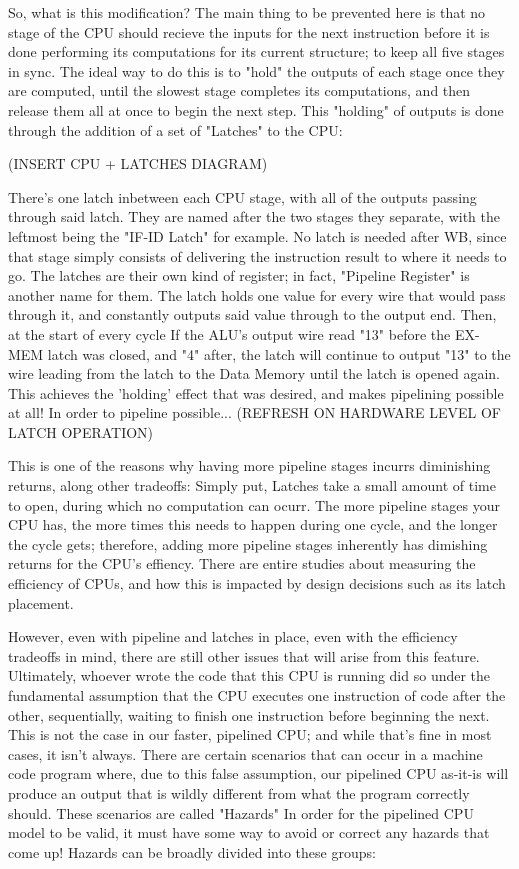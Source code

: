 \documentclass[12pt,twoside]{reedthesis}
\begin{document}
So, what is this modification? The main thing to be prevented here is that no stage of the CPU should recieve the inputs for the next instruction before it is done performing its computations for its current structure; to keep all five stages in sync. The ideal way to do this is to "hold" the outputs of each stage once they are computed, until the slowest stage completes its computations, and then release them all at once to begin the next step. This "holding" of outputs is done through the addition of a set of "Latches" to the CPU:

(INSERT CPU + LATCHES DIAGRAM)

There's one latch inbetween each CPU stage, with all of the outputs passing through said latch. They are named after the two stages they separate, with the leftmost being the "IF-ID Latch" for example. No latch is needed after WB, since that stage simply consists of delivering the instruction result to where it needs to go.
The latches are their own kind of register; in fact, "Pipeline Register" is another name for them. The latch holds one value for every wire that would pass through it, and constantly outputs said value through to the output end. Then, at the start of every cycle If the ALU's output wire read "13" before the EX-MEM latch was closed, and "4" after, the latch will continue to output "13" to the wire leading from the latch to the Data Memory until the latch is opened again. This achieves the 'holding' effect that was desired, and makes pipelining possible at all! In order to pipeline possible... (REFRESH ON HARDWARE LEVEL OF LATCH OPERATION)

This is one of the reasons why having more pipeline stages incurrs diminishing returns, along other tradeoffs: Simply put, Latches take a small amount of time to open, during which no computation can ocurr. The more pipeline stages your CPU has, the more times this needs to happen during one cycle, and the longer the cycle gets; therefore, adding more pipeline stages inherently has dimishing returns for the CPU's effiency. There are entire studies about measuring the efficiency of CPUs, and how this is impacted by design decisions such as its latch placement.

However, even with pipeline and latches in place, even with the efficiency tradeoffs in mind, there are still other issues that will arise from this feature. Ultimately, whoever wrote the code that this CPU is running did so under the fundamental assumption that the CPU executes one instruction of code after the other, sequentially, waiting to finish one instruction before beginning the next. This is not the case in our faster, pipelined CPU; and while that's fine in most cases, it isn't always. There are certain scenarios that can occur in a machine code program where, due to this false assumption, our pipelined CPU as-it-is will produce an output that is wildly different from what the program correctly should. These scenarios are called "Hazards" In order for the pipelined CPU model to be valid, it must  have some way to avoid or correct any hazards that come up! Hazards can be broadly divided into these groups:
\end{document}
